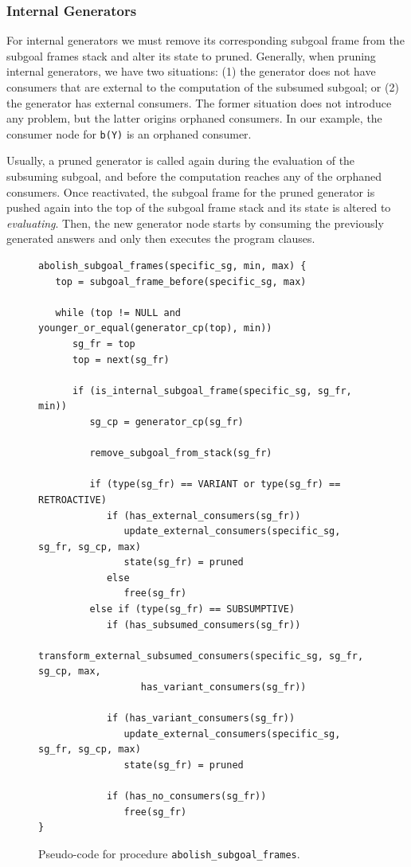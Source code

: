 \subsubsection{Internal Generators}

For internal generators we must remove its corresponding subgoal frame
from the subgoal frames stack and alter its state to pruned. Generally, when pruning internal generators, we
have two situations: (1) the generator does not have consumers that are external to the computation of the
subsumed subgoal; or (2) the generator has external consumers. The former situation does not introduce any
problem, but the latter origins orphaned consumers. In our example, the consumer node for \texttt{b(Y)} is
an orphaned consumer.

Usually, a pruned generator is called again during the evaluation of the subsuming subgoal, and before
the computation reaches any of the orphaned consumers. Once reactivated, the subgoal frame for the pruned
generator is pushed again into the top of the subgoal frame stack and its state is altered to
\textit{evaluating}. Then, the new generator node starts by consuming the previously generated answers
and only then executes the program clauses.

\begin{figure}[ht]
\begin{Verbatim}
abolish_subgoal_frames(specific_sg, min, max) {
   top = subgoal_frame_before(specific_sg, max)

   while (top != NULL and younger_or_equal(generator_cp(top), min))
      sg_fr = top
      top = next(sg_fr)

      if (is_internal_subgoal_frame(specific_sg, sg_fr, min))
         sg_cp = generator_cp(sg_fr)
         
         remove_subgoal_from_stack(sg_fr)
         
         if (type(sg_fr) == VARIANT or type(sg_fr) == RETROACTIVE)
            if (has_external_consumers(sg_fr))
               update_external_consumers(specific_sg, sg_fr, sg_cp, max)
               state(sg_fr) = pruned
            else
               free(sg_fr)
         else if (type(sg_fr) == SUBSUMPTIVE)
            if (has_subsumed_consumers(sg_fr))
               transform_external_subsumed_consumers(specific_sg, sg_fr, sg_cp, max,
                  has_variant_consumers(sg_fr))
            
            if (has_variant_consumers(sg_fr))
               update_external_consumers(specific_sg, sg_fr, sg_cp, max)
               state(sg_fr) = pruned
               
            if (has_no_consumers(sg_fr))
               free(sg_fr)
}
\end{Verbatim}
\caption{Pseudo-code for procedure \texttt{abolish\_subgoal\_frames}.}
\label{fig:abolish_subgoal_frames}
\end{figure}

